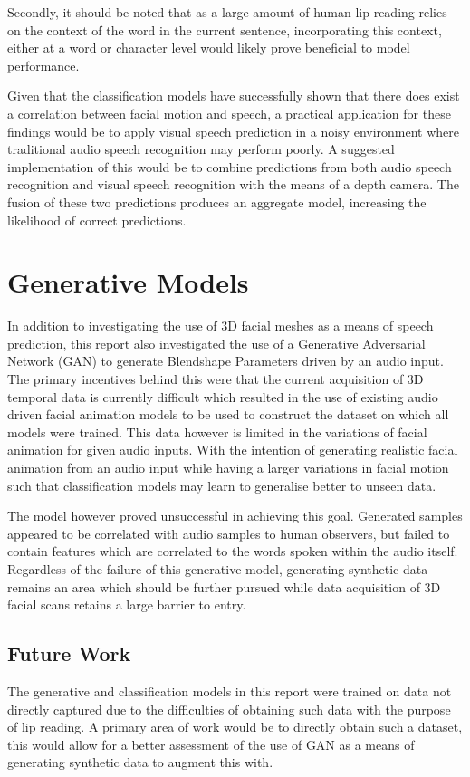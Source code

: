Secondly, it should be noted that as a large amount of human lip reading relies on the context of the word in the current sentence, incorporating this context, either at a word or character level would likely prove beneficial to model performance.

Given that the classification models have successfully shown that there does exist a correlation between facial motion and speech, a practical application for these findings would be to apply visual speech prediction in a noisy environment where traditional audio speech recognition may perform poorly.
A suggested implementation of this would be to combine predictions from both audio speech recognition and visual speech recognition with the means of a depth camera.
The fusion of these two predictions produces an aggregate model, increasing the likelihood of correct predictions.

\section{Generative Models}
In addition to investigating the use of 3D facial meshes as a means of speech prediction, this report also investigated the use of a Generative Adversarial Network (GAN) to generate Blendshape Parameters driven by an audio input.
The primary incentives behind this were that the current acquisition of 3D temporal data is currently difficult which resulted in the use of existing audio driven facial animation models to be used to construct the dataset on which all models were trained.
This data however is limited in the variations of facial animation for given audio inputs.
With the intention of generating realistic facial animation from an audio input while having a larger variations in facial motion such that classification models may learn to generalise better to unseen data.

The model however proved unsuccessful in achieving this goal.
Generated samples appeared to be correlated with audio samples to human observers, but failed to contain features which are correlated to the words spoken within the audio itself.
Regardless of the failure of this generative model, generating synthetic data remains an area which should be further pursued while data acquisition of 3D facial scans retains a large barrier to entry.

\subsection{Future Work}
The generative and classification models in this report were trained on data not directly captured due to the difficulties of obtaining such data with the purpose of lip reading.
A primary area of work would be to directly obtain such a dataset, this would allow for a better assessment of the use of GAN as a means of generating synthetic data to augment this with.

